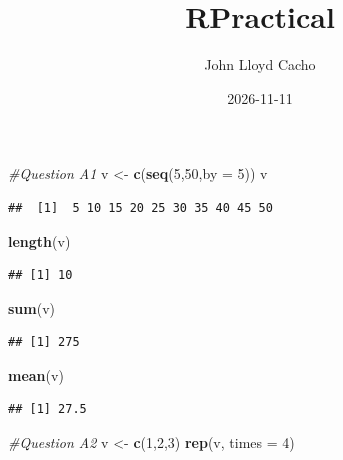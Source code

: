 \documentclass[
]{article}
\title{RPractical}
\author{John Lloyd Cacho}
\date{2026-11-11}
\newenvironment{Shaded}{\begin{snugshade}}{\end{snugshade}}
\newcommand{\AttributeTok}[1]{\textcolor[rgb]{0.13,0.29,0.53}{#1}}
\newcommand{\CommentTok}[1]{\textcolor[rgb]{0.56,0.35,0.01}{\textit{#1}}}
\newcommand{\DecValTok}[1]{\textcolor[rgb]{0.00,0.00,0.81}{#1}}
\newcommand{\FunctionTok}[1]{\textcolor[rgb]{0.13,0.29,0.53}{\textbf{#1}}}
\newcommand{\NormalTok}[1]{#1}
\newcommand{\OtherTok}[1]{\textcolor[rgb]{0.56,0.35,0.01}{#1}}
\begin{document}
\maketitle

\begin{Shaded}
\begin{Highlighting}[]
\CommentTok{\#Question A1}
\NormalTok{v }\OtherTok{\textless{}{-}} \FunctionTok{c}\NormalTok{(}\FunctionTok{seq}\NormalTok{(}\DecValTok{5}\NormalTok{,}\DecValTok{50}\NormalTok{,}\AttributeTok{by =} \DecValTok{5}\NormalTok{))}
\NormalTok{v}
\end{Highlighting}
\end{Shaded}

\begin{verbatim}
##  [1]  5 10 15 20 25 30 35 40 45 50
\end{verbatim}

\begin{Shaded}
\begin{Highlighting}[]
\FunctionTok{length}\NormalTok{(v)}
\end{Highlighting}
\end{Shaded}

\begin{verbatim}
## [1] 10
\end{verbatim}

\begin{Shaded}
\begin{Highlighting}[]
\FunctionTok{sum}\NormalTok{(v)}
\end{Highlighting}
\end{Shaded}

\begin{verbatim}
## [1] 275
\end{verbatim}

\begin{Shaded}
\begin{Highlighting}[]
\FunctionTok{mean}\NormalTok{(v)}
\end{Highlighting}
\end{Shaded}

\begin{verbatim}
## [1] 27.5
\end{verbatim}

\begin{Shaded}
\begin{Highlighting}[]
\CommentTok{\#Question A2}
\NormalTok{v }\OtherTok{\textless{}{-}} \FunctionTok{c}\NormalTok{(}\DecValTok{1}\NormalTok{,}\DecValTok{2}\NormalTok{,}\DecValTok{3}\NormalTok{)}
\FunctionTok{rep}\NormalTok{(v, }\AttributeTok{times =} \DecValTok{4}\NormalTok{)}
\end{Highlighting}
\end{Shaded}
\end{document}

